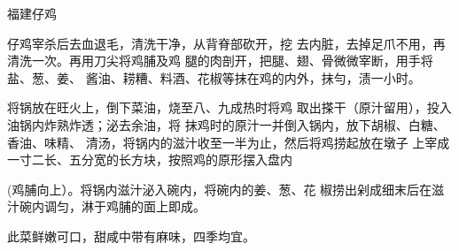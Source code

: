 \begin{recipe}{福建仔鸡}

\ingredients


\cooking

\step 	仔鸡宰杀后去血退毛，清洗干净，从背脊部砍开，挖 去内脏，去掉足爪不用，再清洗一次。再用刀尖将鸡脯及鸡 腿的肉剖开，把腿、翅、骨微微宰断，用手将盐、葱、姜、 酱油、耢糟、料酒、花椒等抹在鸡的内外，抹勻，渍一小时。

\step 	将锅放在旺火上，倒下菜油，烧至八、九成热时将鸡 取出搽干（原汁留用），投入油锅内炸熟炸透；泌去余油，将 抹鸡时的原汁一并倒入锅内，放下胡椒、白糖、香油、味精、 清汤，将锅内的滋汁收至一半为止，然后将鸡捞起放在墩子 上宰成一寸二长、五分宽的长方块，按照鸡的原形摆入盘内

(鸡脯向上）。将锅内滋汁泌入碗内，将碗内的姜、葱、花 椒捞出剁成细末后在滋汁碗内调匀，淋于鸡脯的面上即成。

\notes

此菜鲜嫩可口，甜咸中带有麻味，四季均宜。

\end{recipe}

